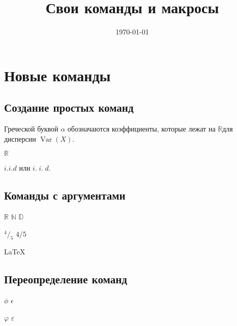\documentclass[12pt, a4paper]{article}
\title{Свои команды и макросы}
\date{\today}
\theoremstyle{plain}  %
\theoremstyle{definition} %
\DeclareMathOperator{\Var}{Var}
\def \a{\alpha}
\def \R{\ensuremath{\mathbb{R}}}
\begin{document}
\maketitle

\section{Новые команды}
\subsection{Создание простых команд}

Греческой буквой $\a$ обозначаются коэффициенты, которые лежат на \R для дисперсии $\Var(X)$.

\newcommand{\RR}{{\color{blue} \ensuremath{\mathbb{R}} }} 


\RR

\newcommand{\iid}{i.\hspace{3pt}i.\hspace{3pt}d.} 

$i.i.d$ или $\iid$ 

\subsection{Команды с аргументами}


\newcommand{\bb}[1]{\ensuremath{\mathbb{#1}} }

\bb{R}  \bb{N} \bb{D}

\newcommand{\fr}[2]{^{#1}/_{#2}}

$\fr{4}{5}$  $4/5$

\LaTeX{} 

\subsection{Переопределение команд}


$\phi$ $\epsilon$

$\varphi$ $\varepsilon$

\renewcommand{\phi}{\varphi} 
\renewcommand{\epsilon}{\varepsilon} 
\end{document}
